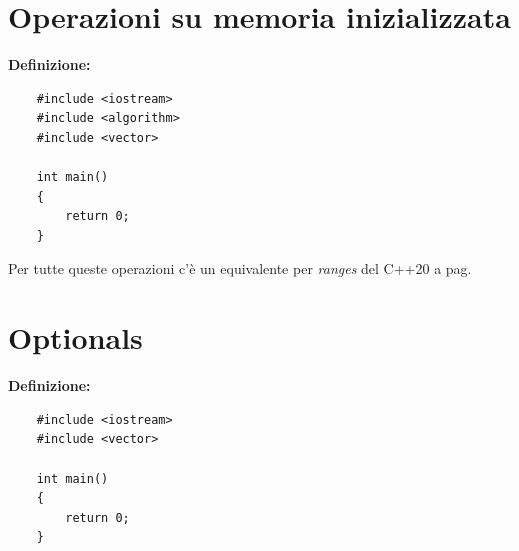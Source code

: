 
\newpage

\section{Operazioni su memoria inizializzata}

\textsf{\small \textbf{Definizione: } } \\

\begin{lstlisting}
	#include <iostream>
	#include <algorithm>
	#include <vector>
	
	int main()
	{
		return 0;
	}
\end{lstlisting}

\fleuron

\textsf{\small Per tutte queste operazioni c'è un equivalente per \emph{ranges} del C++20 a pag. \pageref{ranges}} \\


\newpage

\section{Optionals}


\textsf{\small \textbf{Definizione: } } \\

\begin{lstlisting}
	#include <iostream>
	#include <vector>
	
	int main()
	{
		return 0;
	}
\end{lstlisting}

